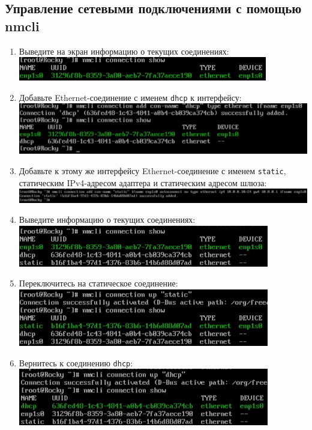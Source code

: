 \documentclass[12pt]{article}
\begin{document}
\subsection{Управление сетевыми подключениями с помощью nmcli}
\begin{enumerate}
	\item Выведите на экран информацию о текущих соединениях:
	      \\\includegraphics{7.png}
	\item Добавьте Ethernet-соединение с именем \texttt{dhcp} к интерфейсу:
	      \\\includegraphics{8.png}
	\item Добавьте к этому же интерфейсу Ethernet-соединение с именем \texttt{static}, статическим IPv4-адресом адаптера и статическим адресом шлюза:
	      \\\includegraphics{9.png}
	\item Выведите информацию о текущих соединениях:
	      \\\includegraphics{10.png}
	\item Переключитесь на статическое соединение:
	      \\\includegraphics{11.png}
	\item Вернитесь к соединению \texttt{dhcp}:
	      \\\includegraphics{12.png}
\end{enumerate}
\end{document}
